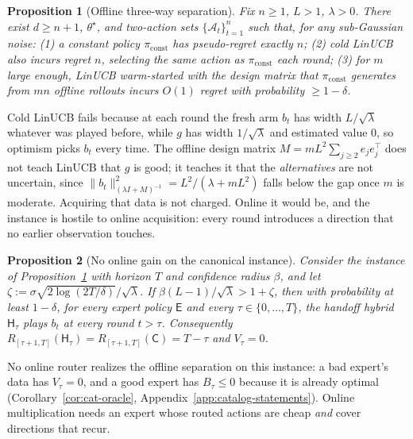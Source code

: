 \documentclass{article}
\newtheorem{proposition}{Proposition}
\theoremstyle{definition}
\theoremstyle{remark}
\theoremstyle{remark}
\newcommand{\Cold}{\mathsf{C}}
\newcommand{\Exp}{\mathsf{E}}
\newcommand{\Hyb}{\mathsf{H}}
\begin{document}
\begin{proposition}[Offline three-way separation]
\label{prop:three-way}
Fix $n\ge1$, $L>1$, $\lambda>0$. There exist $d\ge n+1$, $\theta^\star$, and
two-action sets $\{\mathcal A_t\}_{t=1}^n$ such that, for any sub-Gaussian
noise: (1) a constant policy $\pi_{\mathrm{const}}$ has pseudo-regret exactly
$n$; (2) cold LinUCB also incurs regret $n$, selecting the same action as
$\pi_{\mathrm{const}}$ each round; (3) for $m$ large enough, LinUCB
warm-started with the design matrix that $\pi_{\mathrm{const}}$ generates from
$mn$ \emph{offline} rollouts incurs $O(1)$ regret with probability $\ge1-\delta$.
\end{proposition}

Cold LinUCB fails because at each round the fresh arm $b_t$ has width
$L/\sqrt\lambda$ whatever was played before, while $g$ has width
$1/\sqrt\lambda$ and estimated value $0$, so optimism picks $b_t$ every time.
The offline design matrix $M=mL^2\sum_{j\ge2}e_je_j^\top$ does not teach
LinUCB that $g$ is good; it teaches it that the \emph{alternatives} are not
uncertain, since $\|b_t\|^2_{(\lambda I+M)^{-1}}=L^2/(\lambda+mL^2)$ falls
below the gap once $m$ is moderate. Acquiring that data is not charged.
Online it would be, and the instance is hostile to online acquisition: every
round introduces a direction that no earlier observation touches.

\begin{proposition}[No online gain on the canonical instance]
\label{prop:one-pass}
Consider the instance of Proposition~\ref{prop:three-way} with horizon $T$
and confidence radius $\beta$, and let $\zeta:=\sigma\sqrt{2\log(2T/\delta)}/\sqrt\lambda$.
If $\beta(L-1)/\sqrt\lambda>1+\zeta$, then with probability at least
$1-\delta$, for \emph{every} expert policy $\Exp$ and every $\tau\in\{0,\dots,T\}$,
the handoff hybrid $\Hyb_\tau$ plays $b_t$ at every round $t>\tau$. Consequently
$R_{[\tau+1,T]}(\Hyb_\tau)=R_{[\tau+1,T]}(\Cold)=T-\tau$ and $V_\tau=0$.
\end{proposition}

No online router realizes the offline separation on this instance: a bad
expert's data has $V_\tau=0$, and a good expert has $B_\tau\le0$ because it is
already optimal (Corollary~\ref{cor:cat-oracle},
Appendix~\ref{app:catalog-statements}). Online multiplication needs an expert
whose routed actions are cheap \emph{and} cover directions that recur.
\end{document}

